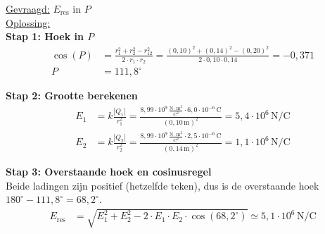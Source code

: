 \documentclass{ximera}
\begin{document}
\begin{exercise}
\begin{solution}
        \underline{Gevraagd:} $E_{\text{res}}$ in $P$\\

        \underline{Oplossing:}\\
        \textbf{Stap 1: Hoek in $P$}
        \begin{align*}
            \cos(P) &= \frac{r_{1}^{2} + r_{2}^{2} - r_{12}^{2}}{2 \cdot r_{1} \cdot r_{2}} = \frac{(0{,}10)^{2} + (0{,}14)^{2} - (0{,}20)^{2}}{2 \cdot 0{,}10 \cdot 0{,}14} = -0{,}371 \\
            P &= 111{,}8^\circ
        \end{align*}

        \textbf{Stap 2: Grootte berekenen}
        \begin{align*}
            E_{1} &= k \frac{|Q_{1}|}{r_{1}^{2}} = \frac{8{,}99 \cdot 10^{9} \, \mathrm{\frac{N \cdot m^2}{C^2}} \cdot 6{,}0 \cdot 10^{-6} \, \mathrm{C}}{(0{,}10 \, \mathrm{m})^{2}} = 5{,}4 \cdot 10^{6} \, \mathrm{N/C} \\
            E_{2} &= k \frac{|Q_{2}|}{r_{2}^{2}} = \frac{8{,}99 \cdot 10^{9} \, \mathrm{\frac{N \cdot m^2}{C^2}} \cdot 2{,}5 \cdot 10^{-6} \, \mathrm{C}}{(0{,}14 \, \mathrm{m})^{2}} = 1{,}1 \cdot 10^{6} \, \mathrm{N/C}
        \end{align*}

        \textbf{Stap 3: Overstaande hoek en cosinusregel}\\
        Beide ladingen zijn positief (hetzelfde teken), dus is de overstaande hoek $180^\circ - 111{,}8^\circ = 68{,}2^\circ$.
        \begin{align*}
            E_{\text{res}} &= \sqrt{E_1^{2} + E_2^{2} - 2 \cdot E_1 \cdot E_2 \cdot \cos(68{,}2^\circ)} \simeq \boxed{5{,}1 \cdot 10^{6} \, \mathrm{N/C}}
        \end{align*}
    \end{solution}
\end{exercise}
\end{document}
